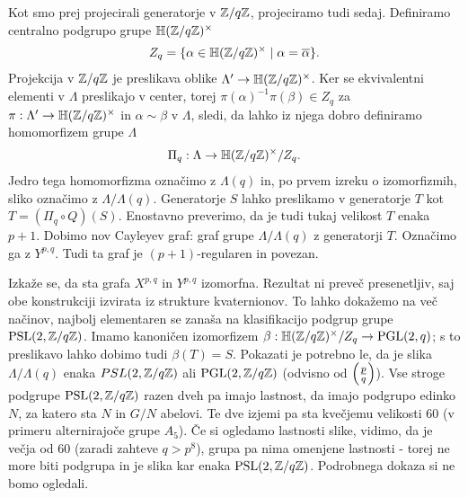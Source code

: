 Kot smo prej projecirali generatorje v \(\mathbb Z/q\mathbb Z\), projeciramo tudi sedaj. Definiramo centralno podgrupo grupe \(\mathbb H(\mathbb Z/q\mathbb Z)^\times\)
\begin{align*}
    Z_q = \{\alpha \in \mathbb H(\mathbb Z/q\mathbb Z)^\times \mid \alpha = \overline\alpha\}.
\end{align*}
Projekcija v \(\mathbb Z/q\mathbb Z\) je preslikava oblike \(\Lambda' \to\mathbb H(\mathbb Z/q\mathbb Z)^\times\). Ker se ekvivalentni elementi v \(\Lambda\) preslikajo v center, torej \(\pi(\alpha)^{-1}\pi(\beta)\in Z_q\) za \(\pi:\Lambda' \to\mathbb H(\mathbb Z/q\mathbb Z)^\times\) in \(\alpha\sim\beta\) v \(\Lambda\), sledi, da lahko iz njega dobro definiramo homomorfizem grupe \(\Lambda\)
\begin{align*}
    \Pi_q: \Lambda \to \mathbb H(\mathbb Z/q\mathbb Z)^\times/Z_q.
\end{align*}
Jedro tega homomorfizma označimo z \(\Lambda(q)\) in, po prvem izreku o izomorfizmih, sliko označimo z \(\Lambda/\Lambda(q)\). Generatorje \(S\) lahko preslikamo v generatorje \(T\) kot \(T=(\Pi_q \circ Q)(S)\). Enostavno preverimo, da je tudi tukaj velikost \(T\) enaka \(p+1\). Dobimo nov Cayleyev graf: graf grupe \(\Lambda/\Lambda(q)\) z generatorji \(T\). Označimo ga z \(Y^{p,q}\). Tudi ta graf je \((p+1)\)-regularen in povezan.

Izkaže se, da sta grafa \(X^{p,q}\) in \(Y^{p,q}\) izomorfna. Rezultat ni preveč presenetljiv, saj obe konstrukciji izvirata iz strukture kvaternionov. To lahko dokažemo na več načinov, najbolj elementaren se zanaša na klasifikacijo podgrup grupe \(\operatorname{PSL}(2, \mathbb Z/q\mathbb Z)\). Imamo kanoničen izomorfizem \(\beta:\mathbb H(\mathbb Z/q\mathbb Z)^\times /Z_q\to \operatorname{PGL}(2, q)\); s to preslikavo lahko dobimo tudi \(\beta(T)=S\). Pokazati je potrebno le, da je slika \(\Lambda/\Lambda(q)\) enaka \(PSL(2, \mathbb Z/q\mathbb Z)\) ali \(\operatorname{PGL}(2, \mathbb Z/q\mathbb Z)\) (odvisno od \(\left(\frac{p}{q}\right)\)). Vse stroge podgrupe \(\operatorname{PSL}(2, \mathbb Z/q\mathbb Z)\) razen dveh pa imajo lastnost, da imajo podgrupo edinko \(N\), za katero sta \(N\) in \(G/N\) abelovi. Te dve izjemi pa sta kvečjemu velikosti 60 (v primeru alternirajoče grupe \(A_5\)). Če si ogledamo lastnosti slike, vidimo, da je večja od \(60\) (zaradi zahteve \(q>p^8\)), grupa pa nima omenjene lastnosti - torej ne more biti podgrupa in je slika kar enaka \(\operatorname{PSL}(2, \mathbb Z/q\mathbb Z)\). Podrobnega dokaza si ne bomo ogledali.


